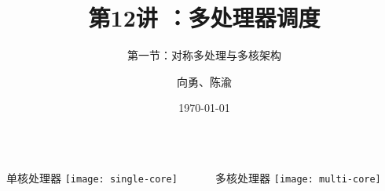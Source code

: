


\title[第1讲]{第12讲 ：多处理器调度} %
\subtitle{第一节：对称多处理与多核架构}
\author{向勇、陈渝} %
\date{\today} %




\begin{frame}
\titlepage %
\end{frame}

%
%

\begin{frame}
	\begin{columns}
	\begin{column}{.5\textwidth}
	\Large
	单核处理器	
    \texttt{[image: single-core]}
		
	\end{column}
	
	\begin{column}{.5\textwidth}
			\Large
		多核处理器
		\texttt{[image: multi-core]}
		
	\end{column}
\end{columns}
\end{frame}

